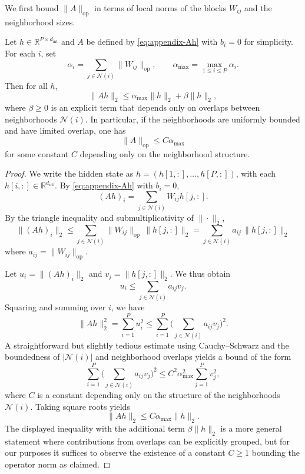 \documentclass[11pt]{article}
\begin{document}
We first bound \(\|A\|_{\mathrm{op}}\) in terms of local norms of the blocks
\(W_{ij}\) and the neighborhood sizes.

\begin{lemma}
\label{lem:row-wise-block-bound}
Let \(h \in \mathbb{R}^{P \times d_{\text{int}}}\) and \(A\) be defined by
\eqref{eq:appendix-Ah} with \(b_i = 0\) for simplicity.
For each \(i\), set
\[
  \alpha_i
  =
  \sum_{j \in \mathcal{N}(i)} \|W_{ij}\|_{\mathrm{op}},
  \qquad
  \alpha_{\max} = \max_{1 \le i \le P} \alpha_i.
\]
Then for all \(h\),
\[
  \|A h\|_2 \le \alpha_{\max} \|h\|_2 + \beta \|h\|_2,
\]
where \(\beta \ge 0\) is an explicit term that depends only on overlaps between
neighborhoods \(\mathcal{N}(i)\). In particular, if the neighborhoods are
uniformly bounded and have limited overlap, one has
\[
  \|A\|_{\mathrm{op}} \le C \alpha_{\max}
\]
for some constant \(C\) depending only on the neighborhood structure.
\end{lemma}

\begin{proof}
We write the hidden state as \(h = (h[1,:],\dots,h[P,:])\), with each
\(h[i,:]\in\mathbb{R}^{d_{\text{int}}}\). By \eqref{eq:appendix-Ah} with
\(b_i=0\),
\[
  (A h)_i = \sum_{j\in\mathcal{N}(i)} W_{ij} h[j,:].
\]
By the triangle inequality and submultiplicativity of \(\|\cdot\|_2\),
\[
  \|(A h)_i\|_2
  \le
  \sum_{j\in\mathcal{N}(i)} \|W_{ij}\|_{\mathrm{op}} \, \|h[j,:]\|_2
  =
  \sum_{j\in\mathcal{N}(i)} a_{ij} \, \|h[j,:]\|_2
\]
where \(a_{ij} = \|W_{ij}\|_{\mathrm{op}}\).

Let \(u_i = \|(A h)_i\|_2\) and \(v_j = \|h[j,:]\|_2\).
We thus obtain
\[
  u_i \le \sum_{j\in\mathcal{N}(i)} a_{ij} v_j.
\]
Squaring and summing over \(i\), we have
\[
  \|A h\|_2^2
  =
  \sum_{i=1}^P u_i^2
  \le
  \sum_{i=1}^P
  \biggl( \sum_{j\in\mathcal{N}(i)} a_{ij} v_j \biggr)^2.
\]
A straightforward but slightly tedious estimate using Cauchy--Schwarz and the
boundedness of \(|\mathcal{N}(i)|\) and neighborhood overlaps yields a bound
of the form
\[
  \sum_{i=1}^P
  \biggl( \sum_{j\in\mathcal{N}(i)} a_{ij} v_j \biggr)^2
  \le
  C^2 \alpha_{\max}^2 \sum_{j=1}^P v_j^2,
\]
where \(C\) is a constant depending only on the structure of the neighborhoods
\(\mathcal{N}(i)\). Taking square roots yields
\[
  \|A h\|_2 \le C \alpha_{\max} \|h\|_2.
\]
The displayed inequality with the additional term \(\beta \|h\|_2\) is a more
general statement where contributions from overlaps can be explicitly grouped,
but for our purposes it suffices to observe the existence of a constant
\(C \ge 1\) bounding the operator norm as claimed.
\end{proof}
\end{document}
